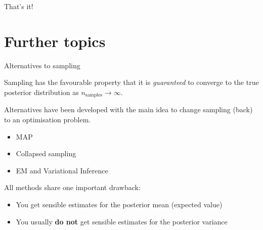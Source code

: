 \documentclass[10pt,handout]{beamer}
\begin{document}
\begin{frame}[c]{}
  
  \Huge That's it!

\end{frame}

\section{Further topics}%
\label{sec:further_topics}


\begin{frame}[t]{Alternatives to sampling}

  Sampling has the favourable property that it is \textit{guaranteed} to converge to the true posterior distribution as $n_{\text{samples}} \to \infty$.

  Alternatives have been developed with the main idea to change sampling (back) to an optimisation problem.

  \begin{itemize}
    \item MAP
    \item Collapsed sampling
    \item EM and Variational Inference
  \end{itemize}

  All methods share one important drawback:

  \begin{itemize}
    \item You get sensible estimates for the posterior mean (expected value)
    \item You usually \textbf{do not} get sensible estimates for the posterior variance
  \end{itemize}

\end{frame}
\end{document}
